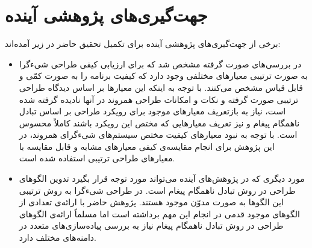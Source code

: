 \section{جهت‌گیری‌های پژوهشی آینده}
برخی از جهت‌گیری‌های پژوهشی آینده برای تکمیل تحقیق حاضر در زیر آمده‌اند:
\begin{itemize}
\item در بررسی‌های صورت گرفته مشخص شد که برای ارزیابی کیفی طراحی شیءگرا به صورت ترتیبی معیارهای مختلفی وجود دارد که کیفیت برنامه را به صورت کمّی و قابل قیاس مشخص می‌کنند. با توجه به اینکه این معیارها بر اساس دیدگاه طراحی ترتیبی صورت گرفته و نکات و امکانات طراحی همروند در آنها نادیده گرفته شده است، نیاز به بازتعریف معیارهای موجود برای رویکرد طراحی بر اساس تبادل ناهمگام پیغام و نیز تعریف معیارهایی که مختص این رویکرد باشند کاملاً محسوس است. با توجه به نبود معیار‌های کیفیت مختص سیستم‌های شیءگرای همروند، در این پژوهش برای انجام مقایسه‌ی کیفی معیارهای مشابه‌ و قابل مقایسه با معیارهای طراحی ترتیبی استفاده شده است.
\item مورد دیگری که در پژوهش‌های آینده می‌تواند مورد توجه قرار بگیرد تدوین الگوهای طراحی در روش تبادل ناهمگام پیغام است. در طراحی شیءگرا به روش ترتیبی این الگوها به صورت مدوّن موجود هستند\cite{GOF}. پژوهش حاضر با ارائه‌ی تعدادی از الگوهای موجود قدمی در انجام این مهم برداشته است  اما مسلماً ارائه‌ی الگوهای طراحی در روش تبادل ناهمگام پیغام نیاز به بررسی پیاده‌سازی‌های متعدد در دامنه‌های مختلف دارد.
\end{itemize}

